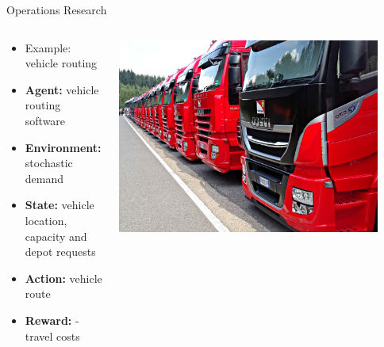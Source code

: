 \documentclass[11pt,table]{beamer}
\begin{document}
\begin{frame}{Operations Research}

\begin{columns}[T]
\begin{column}{0.55\textwidth}
\begin{itemize}
    \item  Example: vehicle routing

\item \textbf{Agent:} vehicle routing software
\item \textbf{Environment:} stochastic demand
\item \textbf{State:} vehicle location,  capacity and depot requests
\item \textbf{Action:} vehicle route
\item \textbf{Reward:} - travel costs 
\end{itemize}
\end{column}
\begin{column}{0.45\textwidth}
\centering
\includegraphics[width=0.9\textwidth]{figures/vehicle_routing.jpg}
\end{column}
\end{columns}
    
\end{frame}
\end{document}
